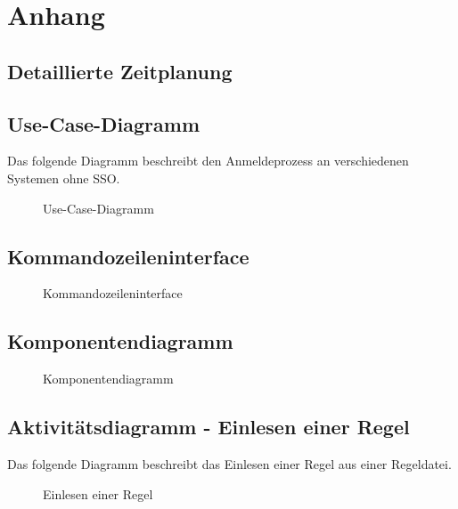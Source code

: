 \section{Anhang}
\subsection{Detaillierte Zeitplanung}
\label{app:Zeitplanung}





\clearpage

\subsection{Use-Case-Diagramm}
\label{app:Use-Case-Diagramm}
Das folgende Diagramm beschreibt den Anmeldeprozess an verschiedenen Systemen ohne \acs{SSO}.
\begin{figure}[htb]
\centering
{}
\caption{Use-Case-Diagramm}
\end{figure}
\clearpage

\subsection{Kommandozeileninterface}
\label{app:cli}
\begin{figure}[htb]
\centering
{}
\caption{Kommandozeileninterface}
\end{figure}
\clearpage

\subsection{Komponentendiagramm}
\label{app:Komponentendiagramm}
\begin{figure}[htb]
\centering
{}
\caption{Komponentendiagramm}
\end{figure}
\clearpage

\subsection{Aktivitätsdiagramm - Einlesen einer Regel}
\label{app:AktivitaetRegelEinlesen}
Das folgende Diagramm beschreibt das Einlesen einer Regel aus einer Regeldatei.
\begin{figure}[htb]
\centering
{}
\caption{Einlesen einer Regel}
\end{figure}
\clearpage

